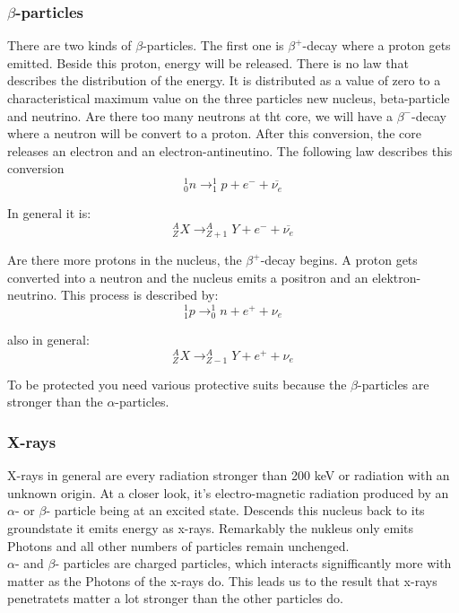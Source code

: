 	\subsubsection*{$\beta$-particles}
There are two kinds of $\beta$-particles. The first one is $\beta^{+}$-decay where a proton gets emitted. Beside this proton, energy will be released. There is no law that describes the distribution of the energy. It is distributed as a value of zero to a characteristical maximum value on the three particles new nucleus, beta-particle and neutrino. 
Are there too many neutrons at tht core, we will have a $\beta^{-}$-decay where a neutron will be convert to a proton. After this conversion, the core releases an electron and an electron-antineutino. The following law describes this conversion
	\begin{equation}
	^{1}_{0}n \rightarrow ^{1}_{1}p + e^{-} + \overline{\nu_{e}}
	\end{equation}

In general it is:
	\begin{equation}
	^{A}_{Z}X \rightarrow ^{A}_{Z+1}Y + e^{-} + \overline{\nu_{e}}
	\end{equation}

Are there more protons in the nucleus, the $\beta^{+}$-decay begins. A proton gets converted into a neutron and the nucleus emits a positron and an elektron-neutrino. This process is described by:
	\begin{equation}
	^{1}_{1}p \rightarrow ^{1}_{0}n + e^{+} + \nu_{e}
	\end{equation}

also in general:
	\begin{equation}
	^{A}_{Z}X \rightarrow ^{A}_{Z-1}Y + e^{+} + \nu_{e}
	\end{equation}

To be protected you need various protective suits because the $\beta$-particles are stronger than the $\alpha$-particles.

	\subsubsection*{X-rays}
	X-rays in general are every radiation stronger than 200 keV or radiation with an unknown origin. At a closer look, it's electro-magnetic radiation produced by an $\alpha$- or $\beta$- particle being at an excited state. Descends this nucleus back to its groundstate it emits energy as x-rays. Remarkably the nukleus only emits Photons and all other numbers of particles remain unchenged.
\\
	$\alpha$- and $\beta$- particles are charged particles, which interacts signifficantly more with matter as the Photons of the x-rays do. This leads us to the result that x-rays penetratets matter a lot stronger than the other particles do.

